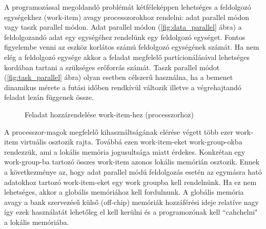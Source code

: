 	A programozással megoldandó problémát kétféleképpen lehetséges a feldolgozó
	egységekhez (work-item) avagy processzorokhoz rendelni:
	adat parallel módon vagy taszk parallel módon.
	Adat parallel módon (\ref{fig:data_parallel} ábra) a feldolgozandó adat egy
	egységéhez rendelünk egy feldolgozó egységet. Fontos figyelembe venni az eszköz korlátos
	számú feldolgozó egységének számát. Ha nem elég a feldolgozó egysége akkor a
	feladat megfelelő partícionálásával lehetséges kordában tartani a szükséges
	erőforrás számát.
	Taszk parallel módot (\ref{fig:task_parallel} ábra) olyan esetben célszerű
	használna, ha a bemenet dinamikus mérete a futási időben rendkívül változik
	illetve a végrehajtandó feladat lezán függenek össze.
	
	\begin{figure}[!h]
		\centering
		\hfil
		\caption{Feladat hozzárendelése work-item-hez (processzorhoz)}
		\label{fig:parallel}
	\end{figure}
	A processzor-magok megfelelő kihasználtságának elérése végett több ezer
	work-item virtuális osztozik rajta.
	Továbbá ezen work-item-eket work-group-okba rendezzük, ami a lokális
	memória jogusultsága miatt érdekes.
	Konkrétan egy work-group-ba tartozó összes work-item azonos lokális memórián
	osztozik. Ennek a következménye az, hogy adat parallel módú feldolgozás esetén
	az egymásra ható adatokhoz tartozó work-item-eket egy work groupba kell
	rendelnünk.
	Ha ez nem lehetséges, akkor a globális memóriához kell fordulnunk.
	A globális memória avagy a bank szervezésű külső (off-chip) memóriák
	hozzáférési ideje relatíve nagy így ezek használatát lehetőleg el kell kerülni
	és a programozónak kell ``cahchelni" a lokális memóriába.
	
